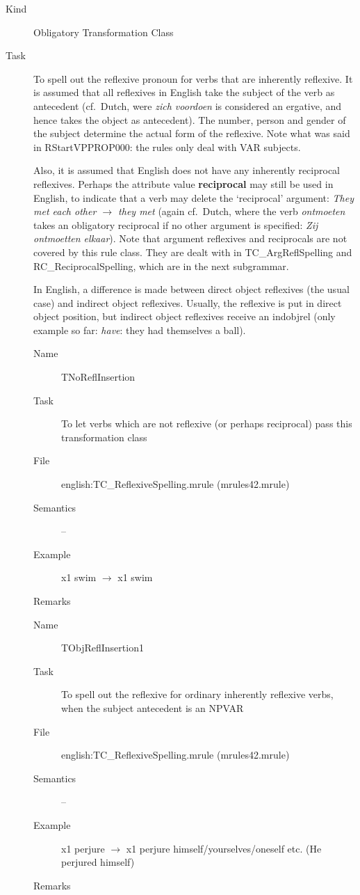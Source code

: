\begin{description}
\item[Kind] Obligatory Transformation Class
\item[Task] To spell out the reflexive pronoun for verbs that are inherently 
reflexive. It is assumed that all reflexives in English take the subject of the 
verb as antecedent (cf.\ Dutch, were {\em zich voordoen\/} is considered an 
ergative, and hence takes the object as antecedent). The number, person and 
gender of the subject determine the actual form of the reflexive. Note what was 
said in RStartVPPROP000: the rules only deal with VAR subjects.

Also, it is assumed that 
English does not have any inherently reciprocal reflexives. Perhaps the 
attribute 
value {\bf reciprocal} may still be used in English, to indicate that a verb
may delete the `reciprocal' argument: {\em They met each other $\rightarrow$ 
they met\/} (again cf.\ Dutch, 
where the verb {\em ontmoeten\/} takes an obligatory reciprocal if no other 
argument is specified: {\em Zij ontmoetten elkaar\/}). Note that argument 
reflexives and reciprocals are not covered by 
this rule class. They are dealt with in TC\_ArgReflSpelling and 
RC\_ReciprocalSpelling, which are in the next subgrammar.

In English, a difference is made between direct object reflexives (the usual 
case) and indirect object reflexives. Usually, the reflexive is put in direct 
object position, but indirect object reflexives receive an indobjrel
(only example so far: {\em have\/}: they had themselves a ball). 


\vspace{1 cm}
\begin{description}
\item[Name] TNoReflInsertion
\item[Task] To let verbs which are not reflexive (or perhaps reciprocal) pass 
this transformation class
\item[File] english:TC\_ReflexiveSpelling.mrule (mrules42.mrule)
\item[Semantics] --
\item[Example] x1 swim $\rightarrow$ x1 swim
\item[Remarks]
\end{description}

\vspace{1 cm}
\begin{description}
\item[Name] TObjReflInsertion1
\item[Task] To spell out the reflexive for ordinary inherently reflexive verbs, 
when the subject antecedent is an NPVAR
\item[File] english:TC\_ReflexiveSpelling.mrule (mrules42.mrule)
\item[Semantics] --
\item[Example] x1 perjure $\rightarrow$ x1 perjure himself/yourselves/oneself 
etc. (He perjured himself)
\item[Remarks]
\end{description}


\end{description}
